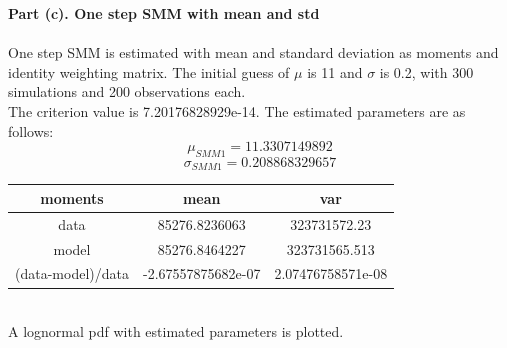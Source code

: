 \documentclass[letterpaper,12pt]{article}
\theoremstyle{definition}
\begin{document}
\clearpage

\noindent\textbf{Part (c). One step SMM with mean and std} \\
\\
One step SMM is estimated with mean and standard deviation as moments and identity weighting matrix. The initial guess of $\mu$ is 11 and $\sigma$ is 0.2, with 300 simulations and 200 observations each.\\
The criterion value is 7.20176828929e-14. The estimated parameters are as follows:
\[\mu_{SMM1}= 11.3307149892\]
\[\sigma_{SMM1}= 0.208868329657\]

\begin{center}
\begin{tabular}{ c|c|c }
 moments & mean & var \\
 \hline
 data & 85276.8236063 & 323731572.23 \\
 model & 85276.8464227 & 323731565.513 \\
 (data-model)/data & -2.67557875682e-07 & 2.07476758571e-08
\end{tabular}
\end{center}
\\

A lognormal pdf with estimated parameters is plotted. \\

\begin{figure}[htb]\centering\captionsetup{width=6.0in}
  \caption{\textbf{}}
\end{figure} \\
\end{document}
